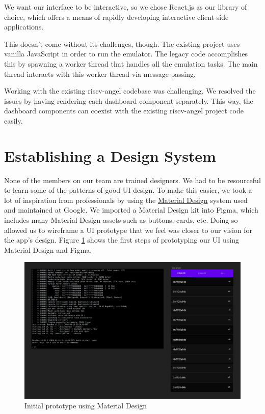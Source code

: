 We want our interface to be interactive, so we chose React.js as our library of choice,
which offers a means of rapidly developing interactive client-side applications.

This doesn't come without its challenges, though. The existing project uses vanilla JavaScript
in order to run the emulator. The legacy code accomplishes this by spawning a worker thread
that handles all the emulation tasks. The main thread interacts with this worker thread via
message passing.

Working with the existing riscv-angel codebase was challenging. We resolved
the issues by having rendering each dashboard component separately. This way,
the dashboard components can coexist with the existing riscv-angel project code
easily.


\section{Establishing a Design System}

None of the members on our team are trained designers. We had to be resourceful
to learn some of the patterns of good UI design. To make this easier, we took
a lot of inspiration from professionals by using the \href{https://material.io/design}{Material Design}
system used and maintained at Google. We imported a Material Design kit into Figma,
which includes many Material Design assets such as buttons, cards, etc. Doing so
allowed us to wireframe a UI prototype that we feel was closer to our vision for the app's design.
Figure \ref{fig:proto2} shows the first steps of prototyping our UI using Material Design and Figma.

\begin{figure}[H]
  \includegraphics[scale=0.26]{prototype2}
  \caption{Initial prototype using Material Design}
  \label{fig:proto2}
  \centering
\end{figure}

